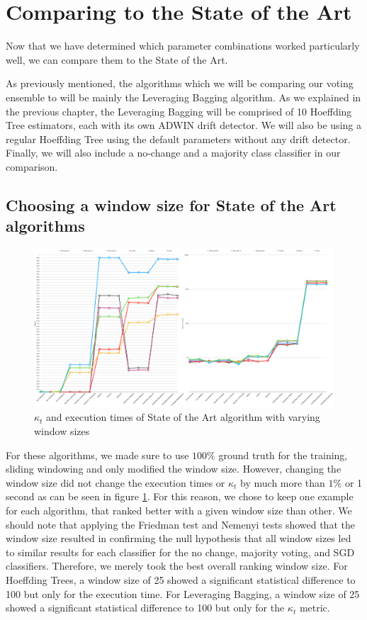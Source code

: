 \section{Comparing to the State of the Art}

Now that we have determined which parameter combinations worked particularly well, we can compare them to the State of the Art.

As previously mentioned, the algorithms which we will be comparing our voting ensemble to will be mainly the Leveraging Bagging algorithm. As we explained in the previous chapter, the Leveraging Bagging will be comprised of 10 Hoeffding Tree estimators, each with its own ADWIN drift detector. We will also be using a regular Hoeffding Tree using the default parameters without any drift detector. Finally, we will also include a no-change and a majority class classifier in our comparison.

\subsection{Choosing a window size for State of the Art algorithms}

\begin{figure}
  \includegraphics[width=\linewidth]{./images/chapter5/compare_sota}
\caption{\label{fig:raw_compare_sota}$\kappa_t$ and execution times of State of the Art algorithm with varying window sizes}
\end{figure}

For these algorithms, we made sure to use $100\%$ ground truth for the training, sliding windowing and only modified the window size. However, changing the window size did not change the execution times or $\kappa_t$ by much more than $1\%$ or 1 second as can be seen in figure \ref{fig:raw_compare_sota}. For this reason, we chose to keep one example for each algorithm, that ranked better with a given window size than other. We should note that applying the Friedman test and Nemenyi tests showed that the window size resulted in confirming the null hypothesis that all window sizes led to similar results for each classifier for the no change, majority voting, and SGD classifiers. Therefore, we merely took the best overall ranking window size. For Hoeffding Trees, a window size of 25 showed a significant statistical difference to 100 but only for the execution time. For Leveraging Bagging, a window size of 25 showed a significant statistical difference to 100 but only for the $\kappa_t$ metric.

